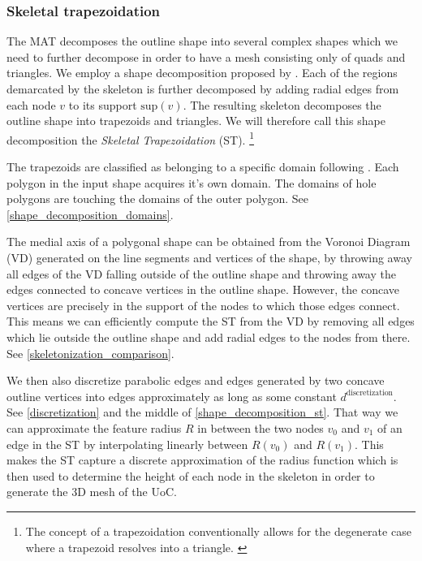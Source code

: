 \subsubsection{Skeletal trapezoidation}
The MAT decomposes the outline shape into several complex shapes which we need to further decompose in order to have a mesh consisting only of quads and triangles.
We employ a shape decomposition proposed by \citeauthor{Ding2016a}. \cite{Ding2016a}
Each of the regions demarcated by the skeleton is further decomposed by adding radial edges from each node $v$ to its support $\text{sup}(v)$.
The resulting skeleton decomposes the outline shape into trapezoids and triangles.
We will therefore call this shape decomposition the \emph{Skeletal Trapezoidation} (ST).
\footnote{The concept of a trapezoidation conventionally allows for the degenerate case where a trapezoid resolves into a triangle. \cite{chazelle1984,fournier1984}}

The trapezoids are classified as belonging to a specific domain following \citeauthor{Ding2016a}.
Each polygon in the input shape acquires it's own domain.
The domains of hole polygons are touching the domains of the outer polygon.
See \cref{shape_decomposition_domains}.


The medial axis of a polygonal shape can be obtained from the Voronoi Diagram (VD) generated on the line segments and vertices of the shape, by throwing away all edges of the VD falling outside of the outline shape and throwing away the edges connected to concave vertices in the outline shape. \cite{lee1982medial}
However, the concave vertices are precisely in the support of the nodes to which those edges connect.
This means we can efficiently compute the ST from the VD by removing all edges which lie outside the outline shape and add radial edges to the nodes from there.
See \cref{skeletonization_comparison}.


We then also discretize parabolic edges and edges generated by two concave outline vertices into edges approximately as long as some constant $d^\text{discretization}$.
See \cref{discretization} and the middle of \cref{shape_decomposition_st}.
That way we can approximate the feature radius $R$ in between the two nodes $v_0$ and $v_1$ of an edge in the ST by interpolating linearly between $R(v_0)$ and $R(v_1)$.
This makes the ST capture a discrete approximation of the radius function which is then used to determine the height of each node in the skeleton in order to generate the 3D mesh of the UoC.





